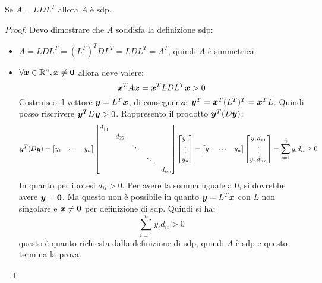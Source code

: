 \begin{exercise}[3.10]
Se $A = LDL^{T}$ allora $A$ \`e sdp.
\end{exercise}
\begin{proof}
Devo dimostrare che $A$ soddisfa la definizione sdp:
\begin{itemize}
\item $A = LDL^{T} = (L^{T})^{T}DL^{T} = LDL^{T} = A^{T}$, quindi $A$ \`e
simmetrica.
\item $\forall \boldsymbol{x} \in \mathbb{R}^{n}, \boldsymbol{x} \not = \boldsymbol{0}$ allora
deve valere:
\begin{displaymath}
\boldsymbol{x}^{T}A\boldsymbol{x} = \boldsymbol{x}^{T}LDL^{T}\boldsymbol{x} > 0
\end{displaymath}
Costruisco il vettore $\boldsymbol{y} = L^{T}\boldsymbol{x}$, di conseguenza $\boldsymbol{y}^{T}
= \boldsymbol{x}^{T}(L^{T})^{T} = \boldsymbol{x}^{T}L$. Quindi posso riscrivere
$\boldsymbol{y}^{T}D\boldsymbol{y} > 0$. Rappresento il prodotto $\boldsymbol{y}^{T}(D\boldsymbol{y})$:
\begin{displaymath}
\boldsymbol{y}^{T}(D\boldsymbol{y}) = 
\begin{bmatrix}
y_{1} & \cdots & y_{n}
\end{bmatrix}
\begin{bmatrix}
d_{11} \\
 & d_{22} \\
 & 		& \ddots \\
 & 		&		& \ddots\\
 &  	&  		&		& d_{nn}
\end{bmatrix}
\begin{bmatrix}
y_{1}\\
\vdots \\
y_{n}
\end{bmatrix} = 
\begin{bmatrix}
y_{1} & \cdots & y_{n}
\end{bmatrix}
\begin{bmatrix}
y_{1}d_{11}\\
\vdots \\
y_{n}d_{nn}
\end{bmatrix} =
\sum_{i = 1}^{n}{y_{i}d_{ii}} \geq 0
\end{displaymath} 
In quanto per ipotesi $d_{ii} > 0$. Per avere la somma uguale a 0, si dovrebbe
avere $\boldsymbol{y} = \boldsymbol{0}$. Ma questo non \`e possibile in quanto $\boldsymbol{y}  
= L^{T}\boldsymbol{x}$ con $L$ non singolare e $\boldsymbol{x} \not = \boldsymbol{0}$ per
definizione di sdp. Quindi si ha:
\begin{displaymath}
\sum_{i = 1}^{n}{y_{i}d_{ii}} > 0
\end{displaymath} 
questo \`e quanto richiesta dalla definizione di sdp, quindi $A$ \`e sdp e
questo termina la prova.
\end{itemize}
\end{proof}

